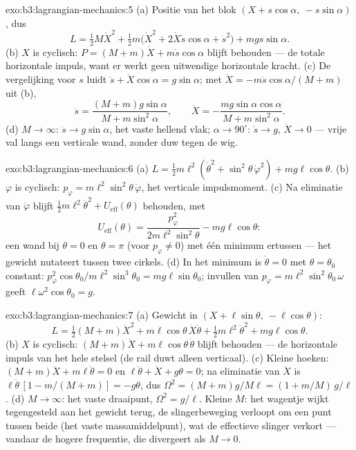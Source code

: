 \begin{solution}{exo:b3:lagrangian-mechanics:5}
(a) Positie van het blok $(X + s\cos\alpha,\ -s\sin\alpha)$, dus
\[
L = \tfrac12 M\dot X^2 + \tfrac12 m\big(\dot X^2 +
2\dot X\dot s\cos\alpha + \dot s^2\big) + mgs\sin\alpha .
\]
(b) $X$ is cyclisch: $P = (M + m)\dot X + m\dot s\cos\alpha$ blijft
behouden --- de totale horizontale impuls, want er werkt geen uitwendige
horizontale kracht. (c) De vergelijking voor $s$ luidt $\ddot s + \ddot
X\cos\alpha = g\sin\alpha$; met $\ddot X = -m\ddot s\cos\alpha/(M +
m)$
uit (b),
\[
\ddot s = \frac{(M + m)g\sin\alpha}{M + m\sin^2\alpha} , \qquad
\ddot X = -\frac{mg\sin\alpha\cos\alpha}{M + m\sin^2\alpha} .
\]
(d) $M \to \infty$: $\ddot s \to g\sin\alpha$, het vaste hellend vlak;
$\alpha \to 90^\circ$: $\ddot s \to g$, $\ddot X \to 0$ --- vrije val
langs een verticale wand, zonder duw tegen de wig.
\end{solution}

\begin{solution}{exo:b3:lagrangian-mechanics:6}
(a) $L = \tfrac12 m\ell^2(\dot\theta^2 + \sin^2\theta\,\dot\varphi^2) +
mg\ell\cos\theta$. (b) $\varphi$ is cyclisch: $p_\varphi =
m\ell^2\sin^2\theta\,\dot\varphi$, het verticale impulsmoment. (c)
Na eliminatie van $\dot\varphi$ blijft $\tfrac12 m\ell^2\dot\theta^2 +
U_{\text{eff}}(\theta)$ behouden, met
\[
U_{\text{eff}}(\theta) = \frac{p_\varphi^2}{2m\ell^2\sin^2\theta}
 - mg\ell\cos\theta :
\]
een wand bij $\theta = 0$ en $\theta = \pi$ (voor $p_\varphi \neq 0$)
met één minimum ertussen --- het gewicht nutateert tussen twee cirkels.
(d) In het minimum is $\dot\theta = 0$ met $\theta = \theta_0$ constant:
$p_\varphi^2\cos\theta_0/m\ell^2\sin^3\theta_0 = mg\ell\sin\theta_0$;
invullen van $p_\varphi = m\ell^2\sin^2\theta_0\,\omega$ geeft
$\ell\omega^2\cos\theta_0 = g$.
\end{solution}

\begin{solution}{exo:b3:lagrangian-mechanics:7}
(a) Gewicht in $(X + \ell\sin\theta,\ -\ell\cos\theta)$:
\[
L = \tfrac12(M + m)\dot X^2 + m\ell\cos\theta\,\dot X\dot\theta
 + \tfrac12 m\ell^2\dot\theta^2 + mg\ell\cos\theta .
\]
(b) $X$ is cyclisch: $(M + m)\dot X + m\ell\cos\theta\,\dot\theta$
blijft behouden --- de horizontale impuls van het hele stelsel (de rail
duwt alleen verticaal). (c) Kleine hoeken: $(M + m)\ddot X +
m\ell\ddot\theta = 0$ en $\ell\ddot\theta + \ddot X + g\theta = 0$; na
eliminatie van $\ddot X$ is $\ell\ddot\theta\,[1 - m/(M + m)] = -g\theta$, dus $\Omega^2 = (M + m)g/M\ell = (1 + m/M)\,g/\ell$. (d) $M \to \infty$: het vaste draaipunt, $\Omega^2 = g/\ell$. Kleine $M$: het
wagentje wijkt tegengesteld aan het gewicht terug, de slingerbeweging
verloopt om een punt tussen beide (het vaste massamiddelpunt), wat de
effectieve slinger verkort --- vandaar de hogere frequentie, die
divergeert als $M \to 0$.
\end{solution}

